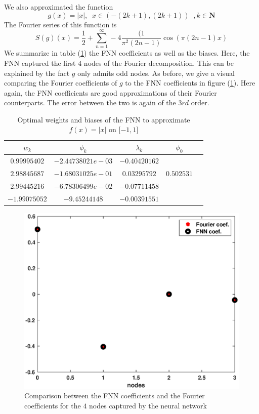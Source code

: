 \documentclass[11pt]{article}
\begin{document}
We also approximated the function
$$
g(x) = |x|, \;\; \text{$x \in \left(-(2k+1), (2k+1)\right)$}\;\;, k \in \mathbf{N}
$$
The Fourier series of this function is
$$
S(g)(x)= \frac{1}{2} + \sum_{n=1}^{\infty} -4 \frac{(1}{\pi^2 (2n - 1)} \cos(\pi (2n - 1)x)
$$
We summarize in table (\ref{tabfnnx2}) the FNN coefficients as well as the biases. Here, the FNN captured the first $4$ nodes of the Fourier decomposition. This can be explained by the fact $g$ only admits odd nodes. As before, we give a visual comparing the Fourier coefficients of $g$ to the FNN coefficients in figure (\ref{Fnnabsx}). Here again, the FNN coefficients are good approximations of their Fourier counterparts. The error between the two is again of the $3rd$ order.\\


\begin{table}[!h]
  \begin{center}
  \begin{tabular}{ |c|c|c|c|c| } 
\hline
$w_k$ & $\phi_k$ & $\lambda_k$& $\phi_0$ \\
\hline
$ 0.99995402$ & $-2.44738021e-03$ &$-0.40420162$& \\ 
$2.98845687$&$-1.68031025e-01$ & $0.03295792$& $0.502531$ \\ 
$2.99445216$& $-6.78306499e-02$ & $-0.07711458$& \\ 
$ -1.99075052$& $-9.45244148$ & $ -0.00391551$& \\ 
\hline
\end{tabular}
\caption{Optimal weights and biases of the FNN to approximate $ f(x) = |x|$ on $[-1, 1$]}\label{tabfnnx2}
\end{center}
\end{table}

  \begin{figure}[!htb]
    \centering
    \includegraphics[width=.8\textwidth]{fnncoeffvsfourcoeffabsx.eps}
    \caption{Comparison between the FNN coefficients and the Fourier coefficients for the $4$ nodes captured by the neural network}
    \label{Fnnabsx}
\end{figure}
\end{document}
